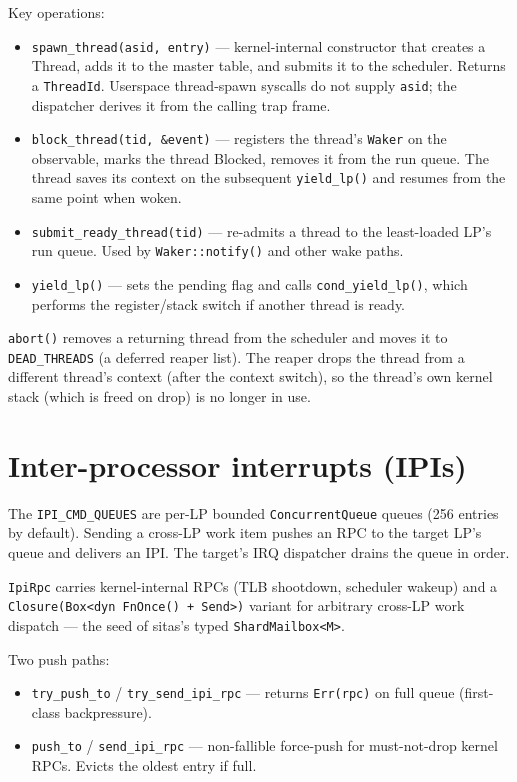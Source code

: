 Key operations:
\begin{itemize}
    \item \texttt{spawn\_thread(asid, entry)} --- kernel-internal constructor
        that creates a Thread, adds it to the master table, and submits it to
        the scheduler. Returns a \texttt{ThreadId}. Userspace thread-spawn
        syscalls do not supply \texttt{asid}; the dispatcher derives it from
        the calling trap frame.
    \item \texttt{block\_thread(tid, \&event)} --- registers the thread's
        \texttt{Waker} on the observable, marks the thread Blocked, removes it
        from the run queue. The thread saves its context on the subsequent
        \texttt{yield\_lp()} and resumes from the same point when woken.
    \item \texttt{submit\_ready\_thread(tid)} --- re-admits a thread to the
        least-loaded LP's run queue. Used by \texttt{Waker::notify()} and other
        wake paths.
    \item \texttt{yield\_lp()} --- sets the pending flag and calls
        \texttt{cond\_yield\_lp()}, which performs the register/stack switch if
        another thread is ready.
\end{itemize}

\texttt{abort()} removes a returning thread from the scheduler and moves it to
\texttt{DEAD\_THREADS} (a deferred reaper list). The reaper drops the thread
from a different thread's context (after the context switch), so the thread's
own kernel stack (which is freed on drop) is no longer in use.

\section{Inter-processor interrupts (IPIs)}

The \texttt{IPI\_CMD\_QUEUES} are per-LP bounded \texttt{ConcurrentQueue}
queues (256 entries by default). Sending a cross-LP work item pushes an RPC to
the target LP's queue and delivers an IPI. The target's IRQ dispatcher drains
the queue in order.

\texttt{IpiRpc} carries kernel-internal RPCs (TLB shootdown, scheduler wakeup)
and a \\ \texttt{Closure(Box<dyn FnOnce() + Send>)} variant for arbitrary
cross-LP work dispatch --- the seed of sitas's typed \texttt{ShardMailbox<M>}.

Two push paths:
\begin{itemize}
    \item \texttt{try\_push\_to} / \texttt{try\_send\_ipi\_rpc} --- returns
        \texttt{Err(rpc)} on full queue (first-class backpressure).
    \item \texttt{push\_to} / \texttt{send\_ipi\_rpc} --- non-fallible
        force-push for must-not-drop kernel RPCs. Evicts the oldest entry if
        full.
\end{itemize}

